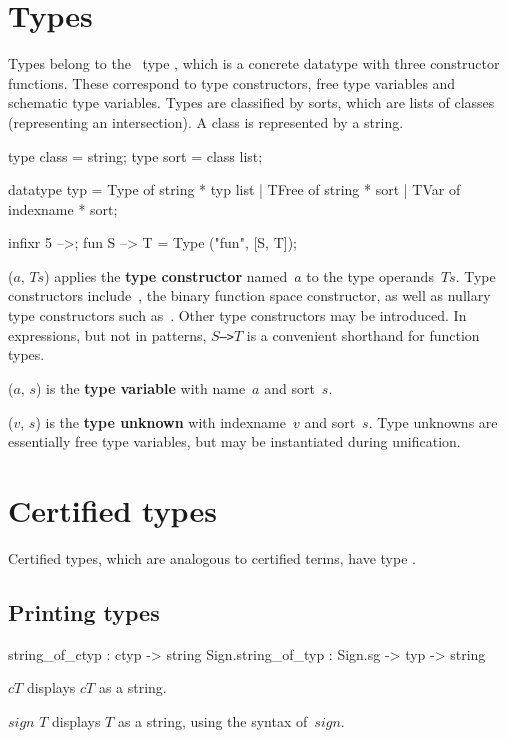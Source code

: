 \section{Types}
Types belong to the \ML\ type , which is a concrete datatype with
three constructor functions.  These correspond to type constructors, free
type variables and schematic type variables.  Types are classified by sorts,
which are lists of classes (representing an intersection).  A class is
represented by a string.
\begin{ttbox}
type class = string;
type sort  = class list;

datatype typ = Type  of string * typ list
             | TFree of string * sort
             | TVar  of indexname * sort;

infixr 5 -->;
fun S --> T = Type ("fun", [S, T]);
\end{ttbox}
\begin{ttdescription}
\item[\ttindexbold{Type} ($a$, $Ts$)] 
  applies the {\bf type constructor} named~$a$ to the type operands~$Ts$.
  Type constructors include~, the binary function space
  constructor, as well as nullary type constructors such as~.
  Other type constructors may be introduced.  In expressions, but not in
  patterns, \hbox{\tt$S$-->$T$} is a convenient shorthand for function
  types.

\item[\ttindexbold{TFree} ($a$, $s$)] 
  is the {\bf type variable} with name~$a$ and sort~$s$.

\item[\ttindexbold{TVar} ($v$, $s$)] 
  is the {\bf type unknown} with indexname~$v$ and sort~$s$.
  Type unknowns are essentially free type variables, but may be
  instantiated during unification.
\end{ttdescription}


\section{Certified types}
Certified types, which are analogous to certified terms, have type
.

\subsection{Printing types}
\begin{ttbox}
     string_of_ctyp :           ctyp -> string
Sign.string_of_typ  : Sign.sg -> typ -> string
\end{ttbox}
\begin{ttdescription}
\item[\ttindexbold{string_of_ctyp} $cT$]
displays $cT$ as a string.

\item[\ttindexbold{Sign.string_of_typ} $sign$ $T$]
displays $T$ as a string, using the syntax of~$sign$.
\end{ttdescription}


